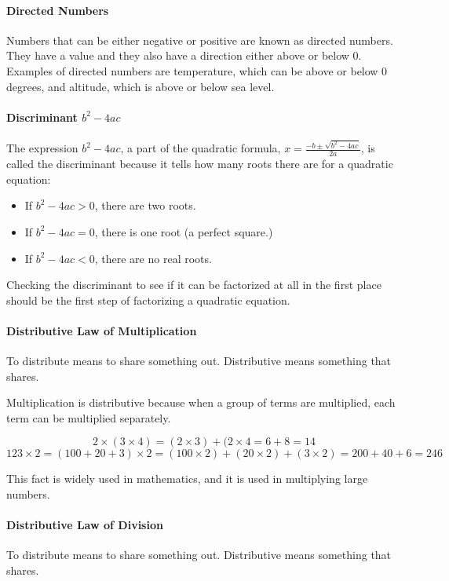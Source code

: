 \documentclass[12pt]{article}
\begin{document}
\paragraph{Directed Numbers}
Numbers that can be either negative or positive are known as directed numbers. They have a value and they also have a direction either above or below 0. Examples of directed numbers are temperature, which can be above or below 0 degrees, and altitude, which is above or below sea level.

\paragraph{Discriminant $b^2 - 4ac$}
The expression $b^2 - 4ac$, a part of the quadratic formula, $x = \frac{-b\pm\sqrt{b^2 - 4ac}}{2a}$, is called the discriminant because it tells how many roots there are for a quadratic equation:
\begin{itemize}
    \item If \( b^2 - 4ac > 0 \), there are two roots.
    \item If \( b^2 - 4ac = 0 \), there is one root (a perfect square.)
    \item If \( b^2 - 4ac < 0 \), there are no real roots.
\end{itemize}

Checking the discriminant to see if it can be factorized at all in the first place should be the first step of factorizing a quadratic equation.

\paragraph{Distributive Law of Multiplication}
To distribute means to share something out. Distributive means something that shares.

Multiplication is distributive because when a group of terms are multiplied, each term can be multiplied separately.

$$2 \times (3 \times 4) = (2 \times 3) + (2 \times 4 = 6+8 = 14$$
$$123 \times 2 = (100+20+3) \times 2 = (100 \times 2) + (20 \times 2) + (3 \times 2) = 200 + 40 + 6 = 246$$

This fact is widely used in mathematics, and it is used in multiplying large numbers.

\paragraph{Distributive Law of Division}
To distribute means to share something out. Distributive means something that shares.
\end{document}
